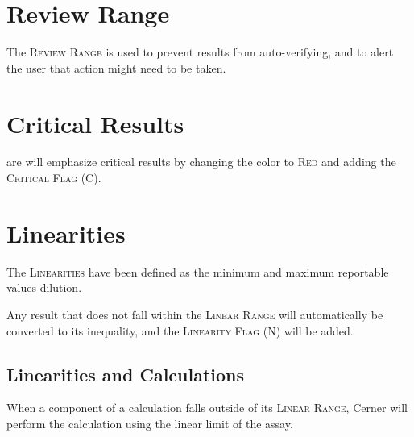 
\section{Review Range}
The \textsc{Review Range} is used to prevent results from auto-verifying, and to alert the user that action might need to be taken.

\section{Critical Results}

\gls{are} will emphasize critical results by changing the color to \textsc{Red} and adding the \textsc{Critical Flag (C)}.\\


\section{Linearities}
The \textsc{Linearities} have been defined as the minimum and maximum reportable values  dilution.

Any result that does not fall within the \textsc{Linear Range} will automatically be converted to its inequality, and the \textsc{Linearity Flag (N)} will be added.


\subsection{Linearities and Calculations}

When a component of a calculation falls outside of its \textsc{Linear Range}, Cerner will perform the calculation using the linear limit of the assay.

